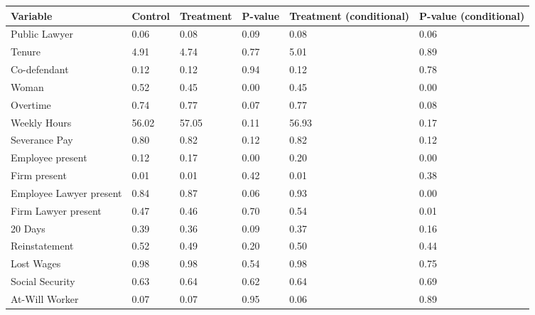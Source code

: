 \begin{tabular}{@{\extracolsep{5pt}} llllll} 
\toprule
Variable & Control & Treatment & P-value & Treatment (conditional) & P-value (conditional) \\ 
\midrule
Public Lawyer &  0.06 &  0.08 & 0.09 &  0.08 & 0.06 \\ 
Tenure &  4.91 &  4.74 & 0.77 &  5.01 & 0.89 \\ 
Co-defendant &  0.12 &  0.12 & 0.94 &  0.12 & 0.78 \\ 
Woman &  0.52 &  0.45 & 0.00 &  0.45 & 0.00 \\ 
Overtime &  0.74 &  0.77 & 0.07 &  0.77 & 0.08 \\ 
Weekly Hours & 56.02 & 57.05 & 0.11 & 56.93 & 0.17 \\ 
Severance Pay &  0.80 &  0.82 & 0.12 &  0.82 & 0.12 \\ 
Employee present &  0.12 &  0.17 & 0.00 &  0.20 & 0.00 \\ 
Firm present &  0.01 &  0.01 & 0.42 &  0.01 & 0.38 \\ 
Employee Lawyer present &  0.84 &  0.87 & 0.06 &  0.93 & 0.00 \\ 
Firm Lawyer present &  0.47 &  0.46 & 0.70 &  0.54 & 0.01 \\ 
20 Days &  0.39 &  0.36 & 0.09 &  0.37 & 0.16 \\ 
Reinstatement &  0.52 &  0.49 & 0.20 &  0.50 & 0.44 \\ 
Lost Wages &  0.98 &  0.98 & 0.54 &  0.98 & 0.75 \\ 
Social Security &  0.63 &  0.64 & 0.62 &  0.64 & 0.69 \\ 
At-Will Worker &  0.07 &  0.07 & 0.95 &  0.06 & 0.89 \\ 
\bottomrule
\end{tabular} 
